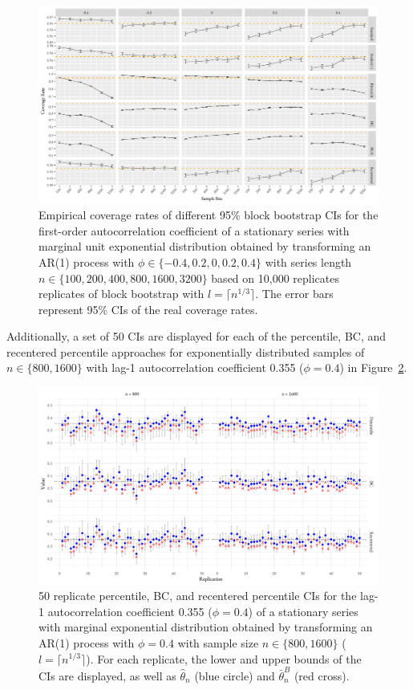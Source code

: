 \documentclass[10pt]{article}
\begin{document}
\begin{figure}[tbp]
  \centering
  \includegraphics[width=\textwidth]{figures/plot_exp_phi_1}
  \caption{Empirical coverage rates of different 95\% block bootstrap CIs for 
    the first-order autocorrelation coefficient of a stationary series
    with marginal unit exponential distribution obtained by transforming an AR(1) 
    process with 
    $\phi \in \{-0.4, 0.2, 0, 0.2, 0.4\}$ with series length
    $n \in \{100, 200, 400, 800, 1600, 3200\}$ based on 10,000 replicates 
    replicates of
    block bootstrap with $l = \lceil n^{1/3} \rceil$. 
    The error bars represent 95\% CIs of the real coverage rates.}
  \label{fig:exp_phi1}
\end{figure}


Additionally, a set of 50 CIs are displayed for each of the percentile, 
BC, and recentered percentile approaches for exponentially distributed
samples of $n \in \{800, 1600\}$ with lag-1 autocorrelation coefficient 0.355
($\phi = 0.4$) in Figure~\ref{fig:eri}.


\begin{figure}[tbp]
  \centering
  \includegraphics[width=\textwidth]{figures/exp_phi_intervals}
  \caption{50 replicate percentile, BC, and recentered percentile CIs for the
    lag-1 autocorrelation coefficient 0.355 ($\phi = 0.4$)
    of a stationary series with marginal exponential distribution
    obtained by transforming an AR(1) process with $\phi = 0.4$ with
    sample size $n \in \{800, 1600\}$ ($l = \lceil n^{1/3} \rceil$). For 
    each replicate, the lower and upper bounds of the CIs are displayed, as well 
    as $\hat\theta_n$ (blue circle) and $\bar\theta_n^{B}$ (red cross).}
  \label{fig:eri}
\end{figure}
\end{document}
